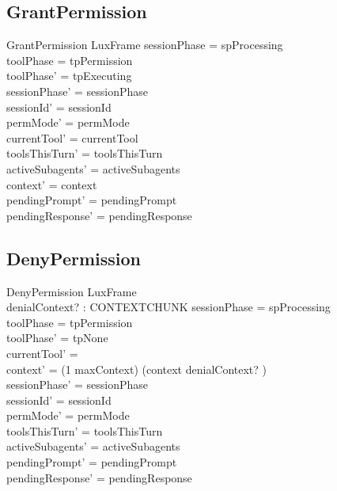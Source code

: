 \documentclass[a4paper,10pt,fleqn]{article}
\begin{document}
\subsection{GrantPermission}

\begin{schema}{GrantPermission}
  LuxFrame
  \where
  sessionPhase = spProcessing \\
  toolPhase = tpPermission \\
  toolPhase' = tpExecuting \\
  sessionPhase' = sessionPhase \\
  sessionId' = sessionId \\
  permMode' = permMode \\
  currentTool' = currentTool \\
  toolsThisTurn' = toolsThisTurn \\
  activeSubagents' = activeSubagents \\
  context' = context \\
  pendingPrompt' = pendingPrompt \\
  pendingResponse' = pendingResponse
\end{schema}

\subsection{DenyPermission}

\begin{schema}{DenyPermission}
  LuxFrame \\
  denialContext? : CONTEXTCHUNK
  \where
  sessionPhase = spProcessing \\
  toolPhase = tpPermission \\
  toolPhase' = tpNone \\
  currentTool' = \emptyset \\
  context' = (1 \upto maxContext) \dres (context \cat \langle denialContext? \rangle) \\
  sessionPhase' = sessionPhase \\
  sessionId' = sessionId \\
  permMode' = permMode \\
  toolsThisTurn' = toolsThisTurn \\
  activeSubagents' = activeSubagents \\
  pendingPrompt' = pendingPrompt \\
  pendingResponse' = pendingResponse
\end{schema}
\end{document}
